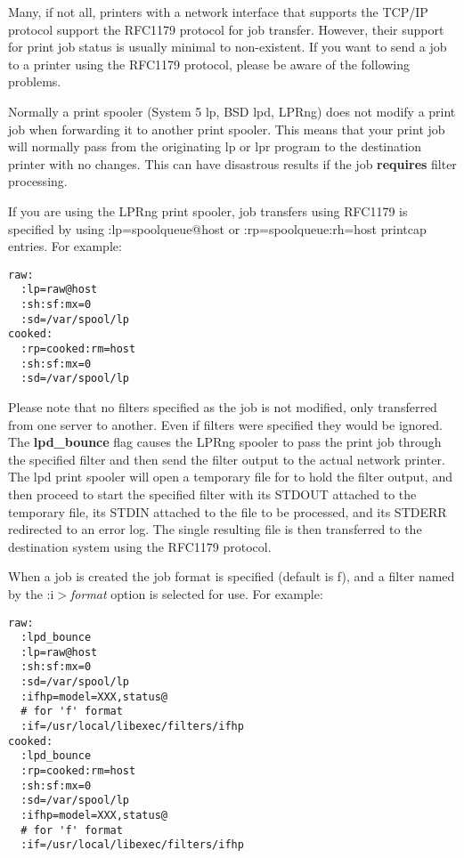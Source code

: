 \documentclass[a4paper]{article}
\begin{document}
Many,
if not all,
printers with a network interface that supports the TCP/IP protocol support
the RFC1179 protocol for job transfer.
However,
their support for print job status is usually minimal to non-existent.
If you want to send a job to a printer using the RFC1179 protocol,
please be aware of the following problems.

Normally a print spooler (System 5 lp, BSD lpd, LPRng)
does not modify a print job when forwarding it to another print spooler.
This means that your print job will normally pass from the originating
{\ttfamily lp} or {\ttfamily lpr} program to the destination printer with no changes.
This can have disastrous results if the job
{\bfseries requires}
filter processing.

If you are using the {\ttfamily LPRng} print spooler,
job transfers using {\ttfamily RFC1179}
is specified by using {\ttfamily :lp=spoolqueue@host}
or {\ttfamily :rp=spoolqueue:rh=host} printcap entries.
For example:
\begin{tscreen}
\begin{verbatim}
raw:
  :lp=raw@host
  :sh:sf:mx=0
  :sd=/var/spool/lp
cooked:
  :rp=cooked:rm=host
  :sh:sf:mx=0
  :sd=/var/spool/lp
\end{verbatim}
\end{tscreen}


Please note that no filters specified as the job is not modified,
only transferred from one server to another.
Even if filters were specified they would be ignored.
The
{\bfseries lpd\_bounce}
flag causes the LPRng spooler to pass the print job through
the specified filter
and then send the filter output to the actual network printer.
The {\ttfamily lpd} print spooler will open a temporary file for
to hold the filter output,
and then proceed to start the specified filter with
its {\ttfamily STDOUT} attached to the temporary file,
its {\ttfamily STDIN} attached to the file to be processed,
and
its {\ttfamily STDERR} redirected to an error log.
The single resulting file is then transferred to the destination
system using the {\ttfamily RFC1179} protocol.

When a job is created
the job format is specified (default is {\ttfamily f}),
and a filter named by the {\ttfamily :i}{$>$}{\itshape format\/} option is selected
for use.
For example:
\begin{tscreen}
\begin{verbatim}
raw:
  :lpd_bounce
  :lp=raw@host
  :sh:sf:mx=0
  :sd=/var/spool/lp
  :ifhp=model=XXX,status@
  # for 'f' format
  :if=/usr/local/libexec/filters/ifhp
cooked:
  :lpd_bounce
  :rp=cooked:rm=host
  :sh:sf:mx=0
  :sd=/var/spool/lp
  :ifhp=model=XXX,status@
  # for 'f' format
  :if=/usr/local/libexec/filters/ifhp
\end{verbatim}
\end{tscreen}
\end{document}
